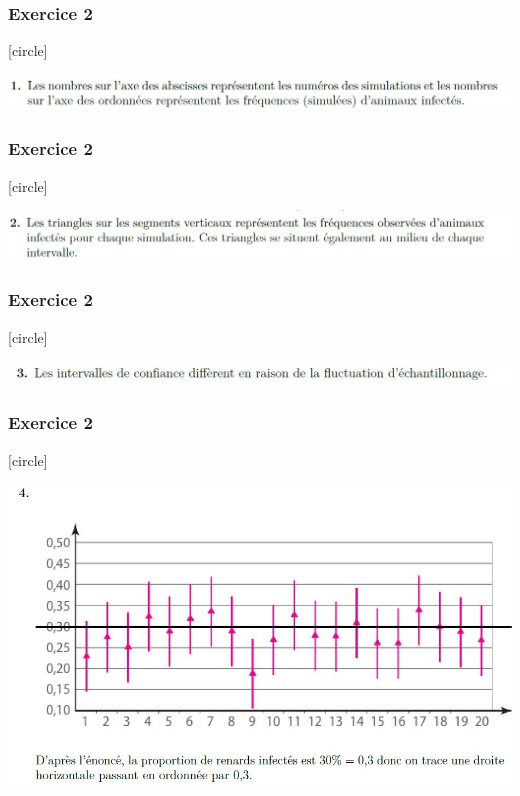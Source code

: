 \documentclass{beamer}
\begin{document}



\begin{frame}
\frametitle{Exercice 2}
[circle]

\includegraphics[scale=0.45]{conf1.jpg}
\end{frame}


\begin{frame}
\frametitle{Exercice 2}
[circle]

\includegraphics[scale=0.45]{conf2.jpg}
\end{frame}


\begin{frame}
\frametitle{Exercice 2}
[circle]

\includegraphics[scale=0.45]{conf3.jpg}
\end{frame}




\begin{frame}
\frametitle{Exercice 2}
[circle]

\includegraphics[scale=0.45]{conf4.jpg}
\end{frame}
\end{document}
